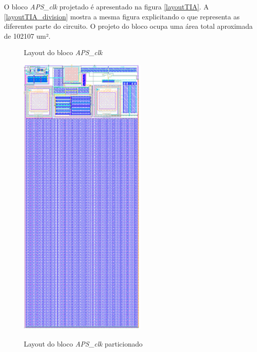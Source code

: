O bloco \textit{APS\_clk} projetado é apresentado na figura \autoref{layoutTIA}. A \autoref{layoutTIA_division} mostra a mesma figura explicitando o que representa as diferentes parte do circuito. O projeto do bloco ocupa uma área total aproximada de 102107 um².

\begin{figure}[htb]
 \centering
    \begin{minipage}{0.5\textwidth}
    \centering
    \caption{Layout do bloco \textit{APS\_clk}} 
    \includegraphics[scale=0.7]{Resultados/Imagens/TIA.png}
    \label{layoutTIA}
    \end{minipage}
    \hfill
    \begin{minipage}{0.4\textwidth}
    \centering
    \caption{Layout do bloco \textit{APS\_clk} particionado}

\end{minipage}
\end{figure}
